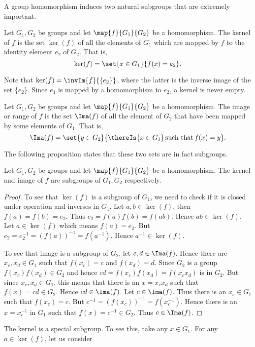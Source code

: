A group homomorphism induces two natural subgroups that are extremely important.
\begin{Definition}[name=Kernel]
    Let $G_1,G_2$ be groups and let $\map{f}{G_1}{G_2}$ be a homomorphism. The kernel of $f$ is the set
    $\ker(f)$ of all the elements of $G_1$ which are mapped by $f$ to the identity element $e_2$ of $G_2$.
    That is,
    \[\ker(f) = \set{x \in G_1}{f(x) = e_2}.\]
\end{Definition}
Note that $\ker(f) = \invIm{f}{\lbrace e_2 \rbrace}$, where the latter is the inverse image of the set
$\lbrace e_2 \rbrace$. Since $e_1$ is mapped by a homomorphism to $e_2$, a kernel is never empty.
\begin{Definition}[name=Image or Range]
    Let $G_1,G_2$ be groups and let $\map{f}{G_1}{G_2}$ be a homomorphism. The image or range of $f$ is the 
    set $\Ima(f)$ of all the element of $G_2$ that have been mapped by some elements of $G_1$. That is,
    \[\Ima(f) = \set{y \in G_2}{\thereIs{x\in G_1}\,\text{such that}\, f(x) = y}.\]
\end{Definition}
The following proposition states that these two sets are in fact subgroups.
\begin{Proposition}
    Let $G_1,G_2$ be groups and let $\map{f}{G_1}{G_2}$ be a homomorphism. The kernel and image of $f$ 
    are subgroups of $G_1,G_2$ respectively.
\end{Proposition}
\begin{proof}
    To see that $\ker(f)$ is a subgroup of $G_1$, we need to check if it is closed under operation and inverses
    in $G_1$. Let $a,b \in \ker(f)$, then $f(a) = f(b) = e_2$. Thus $e_2 = f(a)f(b) = f(ab)$. Hence $ab \in
    \ker(f)$. Let $a \in \ker(f)$ which means $f(a) = e_2$. But $e_2 = e_2^{-1} = {(f(a))}^{-1} = f(a^{-1})$.
    Hence $a^{-1} \in \ker(f)$.

    To see that image is a subgroup of $G_2$, let $c,d \in \Ima(f)$. Hence there are $x_c,x_d \in G_1$ such
    that $f(x_c) = c$ and $f(x_d) = d$. Since $G_2$ is a group $f(x_c)f(x_d) \in G_2$ and hence
    $cd = f(x_c)f(x_d) = f(x_c x_d)$ is in $G_2$. But since $x_c,x_d \in G_1$, this means that there is an $x
    = x_c x_d$ such that $f(x) = cd \in G_2$. Hence $cd \in \Ima(f)$. Let $c \in \Ima(f)$. Thus there is an
    $x_c \in G_1$ such that $f(x_c) = c$. But $c^{-1} = {(f(x_c))}^{-1} = f(x_c^{-1})$. Hence there is an $x =
    x_c^{-1}$ in $G_1$ such that $f(x) = c^{-1} \in G_2$. Thus $c \in \Ima(f)$. 
\end{proof}
The kernel is a special subgroup. To see this, take any $x \in G_1$. For any $a \in \ker(f)$, let us consider
